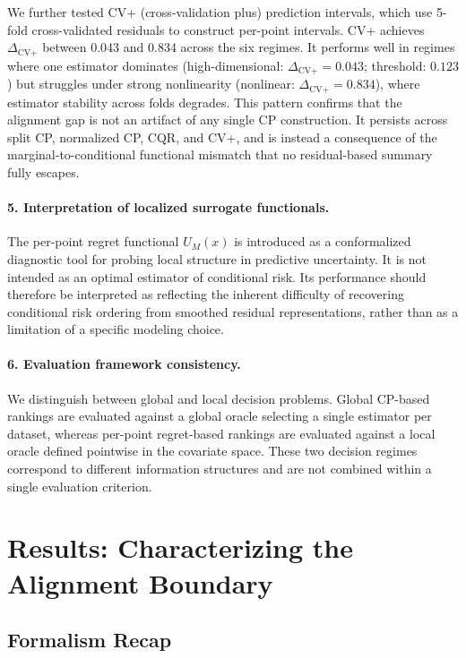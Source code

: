 \documentclass[pdflatex,sn-mathphys-ay]{sn-jnl}%
\theoremstyle{thmstyleone}%
\theoremstyle{thmstyletwo}%
\theoremstyle{thmstylethree}%
\begin{document}
We further tested CV+ (cross-validation plus) prediction intervals, which use 5-fold cross-validated residuals to construct per-point intervals. CV+ achieves $\Delta_{\text{CV+}}$ between 0.043 and 0.834 across the six regimes. It performs well in regimes where one estimator dominates (high-dimensional: $\Delta_{\text{CV+}} = 0.043$; threshold: $0.123$) but struggles under strong nonlinearity (nonlinear: $\Delta_{\text{CV+}} = 0.834$), where estimator stability across folds degrades. This pattern confirms that the alignment gap is not an artifact of any single CP construction. It persists across split CP, normalized CP, CQR, and CV+, and is instead a consequence of the marginal-to-conditional functional mismatch that no residual-based summary fully escapes.

\paragraph{5. Interpretation of localized surrogate functionals.}
The per-point regret functional $U_M(x)$ is introduced as a conformalized diagnostic tool for probing local structure in predictive uncertainty. It is not intended as an optimal estimator of conditional risk. Its performance should therefore be interpreted as reflecting the inherent difficulty of recovering conditional risk ordering from smoothed residual representations, rather than as a limitation of a specific modeling choice.

\paragraph{6. Evaluation framework consistency.}
We distinguish between global and local decision problems. Global CP-based rankings are evaluated against a global oracle selecting a single estimator per dataset, whereas per-point regret-based rankings are evaluated against a local oracle defined pointwise in the covariate space. These two decision regimes correspond to different information structures and are not combined within a single evaluation criterion.

\section{Results: Characterizing the Alignment Boundary}
\label{sec:results}

\subsection{Formalism Recap}
\end{document}
